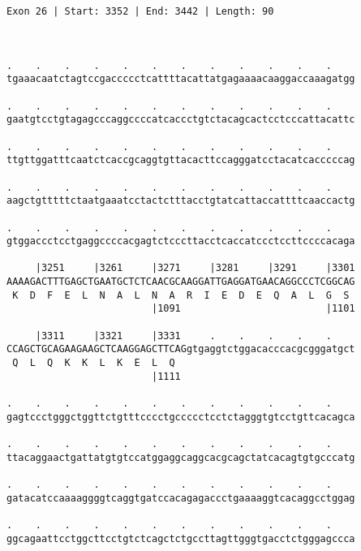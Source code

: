 \documentclass{article}
\begin{document}
\begin{Verbatim}
Exon 26 | Start: 3352 | End: 3442 | Length: 90



.    .    .    .    .    .    .    .    .    .    .    .    
tgaaacaatctagtccgaccccctcattttacattatgagaaaacaaggaccaaagatgg
                                                            
.    .    .    .    .    .    .    .    .    .    .    .    
gaatgtcctgtagagcccaggccccatcaccctgtctacagcactcctcccattacattc
                                                            
.    .    .    .    .    .    .    .    .    .    .    .    
ttgttggatttcaatctcaccgcaggtgttacacttccagggatcctacatcacccccag
                                                            
.    .    .    .    .    .    .    .    .    .    .    .    
aagctgtttttctaatgaaatcctactctttacctgtatcattaccattttcaaccactg
                                                            
.    .    .    .    .    .    .    .    .    .    .    .    
gtggaccctcctgaggccccacgagtctcccttacctcaccatccctccttccccacaga
                                                            
     |3251     |3261     |3271     |3281     |3291     |3301
AAAAGACTTTGAGCTGAATGCTCTCAACGCAAGGATTGAGGATGAACAGGCCCTCGGCAG
 K  D  F  E  L  N  A  L  N  A  R  I  E  D  E  Q  A  L  G  S 
                         |1091                         |1101
  
     |3311     |3321     |3331     .    .    .    .    .    
CCAGCTGCAGAAGAAGCTCAAGGAGCTTCAGgtgaggtctggacacccacgcgggatgct
 Q  L  Q  K  K  L  K  E  L  Q                               
                         |1111                              
  
.    .    .    .    .    .    .    .    .    .    .    .    
gagtccctgggctggttctgtttcccctgccccctcctctagggtgtcctgttcacagca
                                                            
.    .    .    .    .    .    .    .    .    .    .    .    
ttacaggaactgattatgtgtccatggaggcaggcacgcagctatcacagtgtgcccatg
                                                            
.    .    .    .    .    .    .    .    .    .    .    .    
gatacatccaaaaggggtcaggtgatccacagagaccctgaaaaggtcacaggcctggag
                                                            
.    .    .    .    .    .    .    .    .    .    .    .    
ggcagaattcctggcttcctgtctcagctctgccttagttgggtgacctctgggagccca
                                                            

\end{Verbatim}
\end{document}
